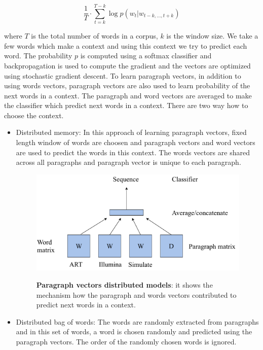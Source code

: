 \begin{equation}
\frac{1}{T} \cdot \sum_{t=k}^{T-k} \log p(w_t|w_{t-k,...,t+k})
\end{equation}

where $T$ is the total number of words in a corpus, $k$ is the window size. We take a few words which make a context and using this context we try to predict each word. The probability $p$ is computed using a softmax classifier and backpropagation is used to compute the gradient and the vectors are optimized using stochastic gradient descent. To learn paragraph vectors, in addition to using words vectors, paragraph vectors are also used to learn probability of the next words in a context. The paragraph and word vectors are averaged to make the classifier which predict next words in a context. There are two way how to choose the context. 

\begin{itemize}
\item Distributed memory: In this approach of learning paragraph vectors, fixed length window of words are choosen and paragraph vectors and word vectors are used to predict the words in this context. The words vectors are shared across all paragraphs and paragraph vector is unique to each paragraph.

\begin{figure}[h]
\begin{centering}
    {\includegraphics[scale=0.7]{figures/dm_pv.pdf}}
    \caption[Distributed model]{\textbf{Paragraph vectors distributed models}: it shows the mechanism how the paragraph and words vectors contributed to predict next words in a context.}
\end{centering}
\end{figure}

\item Distributed bag of words: The words are randomly extracted from paragraphs and in this set of words, a word is chosen randomly and predicted using the paragraph vectors. The order of the randomly chosen words is ignored.  
\end{itemize}


